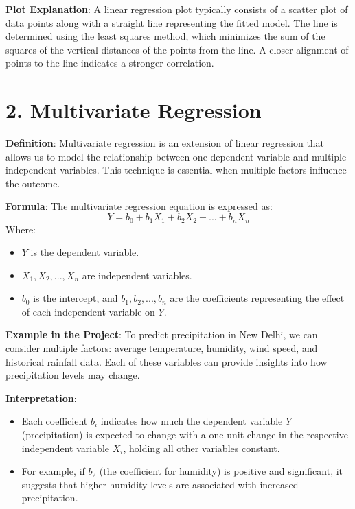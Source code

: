 \documentclass{article}
\begin{document}
\textbf{Plot Explanation}: A linear regression plot typically consists of a scatter plot of data points along with a straight line representing the fitted model. The line is determined using the least squares method, which minimizes the sum of the squares of the vertical distances of the points from the line. A closer alignment of points to the line indicates a stronger correlation.

\section{2. Multivariate Regression}

\textbf{Definition}: Multivariate regression is an extension of linear regression that allows us to model the relationship between one dependent variable and multiple independent variables. This technique is essential when multiple factors influence the outcome.

\textbf{Formula}: The multivariate regression equation is expressed as:
\begin{equation}
Y = b_0 + b_1X_1 + b_2X_2 + ... + b_nX_n 
\end{equation}
Where:
\begin{itemize}
    \item $Y$ is the dependent variable.
    \item $X_1, X_2, ..., X_n$ are independent variables.
    \item $b_0$ is the intercept, and $b_1, b_2, ..., b_n$ are the coefficients representing the effect of each independent variable on $Y$.
\end{itemize}

\textbf{Example in the Project}: To predict precipitation in New Delhi, we can consider multiple factors: average temperature, humidity, wind speed, and historical rainfall data. Each of these variables can provide insights into how precipitation levels may change.

\textbf{Interpretation}: 
\begin{itemize}
    \item Each coefficient $b_i$ indicates how much the dependent variable $Y$ (precipitation) is expected to change with a one-unit change in the respective independent variable $X_i$, holding all other variables constant.
    \item For example, if $b_2$ (the coefficient for humidity) is positive and significant, it suggests that higher humidity levels are associated with increased precipitation.
\end{itemize}
\end{document}
